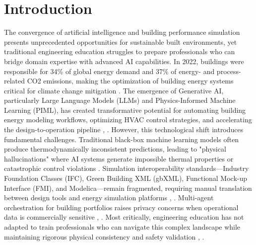 \documentclass[12pt,a4paper]{article}
\begin{document}
\section{Introduction}
The convergence of artificial intelligence and building performance simulation presents unprecedented opportunities for sustainable built environments, yet traditional engineering education struggles to prepare professionals who can bridge domain expertise with advanced AI capabilities. In 2022, buildings were responsible for 34\% of global energy demand and 37\% of energy- and process-related CO2 emissions, making the optimization of building energy systems critical for climate change mitigation \cite{ref1}. The emergence of Generative AI, particularly Large Language Models (LLMs) and Physics-Informed Machine Learning (PIML), has created transformative potential for automating building energy modeling workflows, optimizing HVAC control strategies, and accelerating the design-to-operation pipeline \cite{ref2}, \cite{ref3}.
However, this technological shift introduces fundamental challenges. Traditional black-box machine learning models often produce thermodynamically inconsistent predictions, leading to "physical hallucinations" where AI systems generate impossible thermal properties or catastrophic control violations \cite{ref56}. Simulation interoperability standards---Industry Foundation Classes (IFC), Green Building XML (gbXML), Functional Mock-up Interface (FMI), and Modelica---remain fragmented, requiring manual translation between design tools and energy simulation platforms \cite{ref2}, \cite{ref67}. Multi-agent orchestration for building portfolios raises privacy concerns when operational data is commercially sensitive \cite{ref153}, \cite{ref58}. Most critically, engineering education has not adapted to train professionals who can navigate this complex landscape while maintaining rigorous physical consistency and safety validation \cite{ref34}, \cite{ref35}.
\end{document}
